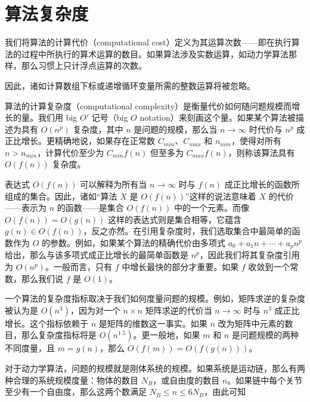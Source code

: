 \documentclass[10pt,a4paper]{book}
\theoremstyle{thmstyle} %
\theoremstyle{defstyle} %
\theoremstyle{prostyle} %
\begin{document}
\section{算法复杂度}





我们将算法的计算代价（computational cost）定义为其运算次数——即在执行算法的过程中所执行的算术运算的数目。如果算法涉及实数运算，如动力学算法那样，那么习惯上只计浮点运算的次数。



因此，诸如计算数组下标或递增循环变量所需的整数运算将被忽略。



算法的计算复杂度（computational complexity）是衡量代价如何随问题规模而增长的量。我们用 big $O'$ 记号（big $O$ notation）来刻画这个量。如果某个算法被描述为具有 $O(n^p)$ 复杂度，其中 $n$ 是问题的规模，那么当 $n \to \infty$ 时代价与 $n^p$ 成正比增长。更精确地说，如果存在正常数 $C_{min}$、$C_{max}$ 和 $n_{min}$，使得对所有 $n > n_{min}$，计算代价至少为 $C_{min}f(n)$ 但至多为 $C_{max}f(n)$，则称该算法具有 $O(f(n))$ 复杂度。



表达式 $O(f(n))$ 可以解释为所有当 $n \to \infty$ 时与 $f(n)$ 成正比增长的函数所组成的集合。因此，诸如“算法 $X$ 是 $O(f(n))$”这样的说法意味着 $X$ 的代价——表示为 $n$ 的函数——是集合 $O(f(n))$ 中的一个元素。而像 $O(f(n)) = O(g(n))$ 这样的表达式则是集合相等，它蕴含 $g(n) \in O(f(n))$，反之亦然。在引用复杂度时，我们选取集合中最简单的函数作为 $O$ 的参数。例如，如果某个算法的精确代价由多项式 $a_0 + a_1n + \cdots + a_pn^p$ 给出，那么与该多项式成正比增长的最简单函数是 $n^p$，因此我们将其复杂度引用为 $O(n^p)$。一般而言，只有 $f$ 中增长最快的部分才重要。如果 $f$ 收敛到一个常数，那么我们说 $f$ 是 $O(1)$。



一个算法的复杂度指标取决于我们如何度量问题的规模。例如，矩阵求逆的复杂度被认为是 $O(n^3)$，因为对一个 $n \times n$ 矩阵求逆的代价当 $n \to \infty$ 时与 $n^3$ 成正比增长。这个指标依赖于 $n$ 是矩阵的维数这一事实。如果 $n$ 改为矩阵中元素的数目，那么复杂度指标将是 $O(n^{1.5})$。更一般地，如果 $m$ 和 $n$ 是问题规模的两种不同度量，且 $m = g(n)$，那么 $O(f(m)) = O(f(g(n)))$。



对于动力学算法，问题的规模就是刚体系统的规模。如果系统是运动链，那么有两种合理的系统规模度量：物体的数目 $N_B$，或自由度的数目 $n$。如果链中每个关节至少有一个自由度，那么这两个数满足 $N_B \leq n \leq 6N_B$，由此可知
\end{document}
